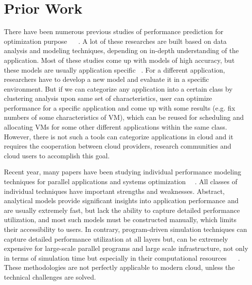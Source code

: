 

\section{Prior Work}
\label{sec:PriorWork}



There have been numerous previous studies of performance prediction for optimization purpose~\cite{Yang2005} ~\cite{Matsunaga2010} . A lot of these researches are built based on data analysis and modeling techniques, depending on in-depth understanding of the application. Most of these studies come up with models of high accuracy, but these models are usually application specific ~\cite{Shan2008}. For a different application, researchers have to develop a new model and evaluate it in a specific environment. But if we can categorize any application into a certain class by clustering analysis upon same set of characteristics, user can optimize performance for a specific application and come up with some results (e.g. fix numbers of some characteristics of VM), which can be reused for scheduling and allocating VMs for some other different applications within the same class. However, there is not such a tools can categorize applications in cloud and it requires the cooperation between cloud providers, research communities and cloud users to accomplish this goal.

Recent year, many papers have been studying individual performance modeling techniques for parallel applications and systems optimization ~\cite{Brian98}~\cite{Yang2005}. All classes of individual techniques have important strengths and weaknesses. Abstract, analytical models provide significant insights into application performance and are usually extremely fast, but lack the ability to capture detailed performance utilization, and most such models must be constructed manually, which limits their accessibility to users. In contrary, program-driven simulation techniques can capture detailed performance utilization at all layers but, can be extremely expensive for large-scale parallel programs and large scale infrastructure, not only in terms of simulation time but especially in their computational resources ~\cite{Huaxia1999} ~\cite{Michael2015}. These methodologies are not perfectly applicable to modern cloud, unless the technical challenges are solved.

